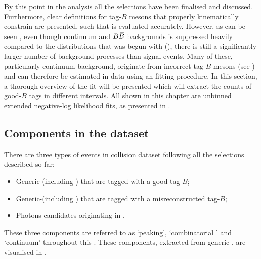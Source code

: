 By this point in the analysis all the selections have been finalised and discussed.
Furthermore, clear definitions for tag-$B$ mesons that properly kinematically constrain \BtoXsgamma are presented, such that \EB is evaluated accurately.
However, as can be seen , even though continuum and $B\kern 0.18em\overline{\kern -0.18em B}{}$ backgrounds is suppressed heavily compared to the \EB distributions that was begun with (),
there is still a significantly larger number of background processes than \BtoXsgamma signal events.
Many of these, particularly continuum background, originate from incorrect tag-$B$ mesons (see ) and can therefore be estimated in data using an \Mbc fitting procedure.
In this section, a thorough overview of the \Mbc fit will be presented which will extract the counts of good-$B$ tags in different \EB intervals.
All shown in this chapter are unbinned extended negative-log likelihood fits, as presented in .


\subsection{Components in the dataset}\label{sec:fitting_components}

There are three types of events in \epem collision dataset following all the selections described so far:
\begin{itemize}
    \item Generic-\BB (including \BtoXsgamma) that are tagged with a good tag-$B$;
    \item Generic-\BB (including \BtoXsgamma) that are tagged with a misreconstructed tag-$B$;
    \item Photons candidates originating in \epem\ra\qqbar.
\end{itemize}
These three components are referred to as `peaking', `combinatorial \BB' and `continuum' throughout this .
These components, extracted from generic \MC, are visualised in .

